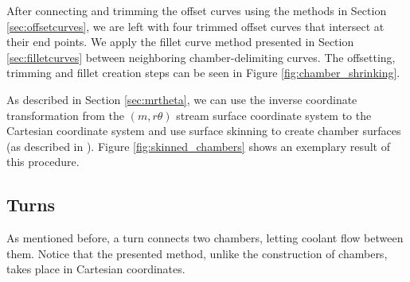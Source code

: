 \documentclass[a4paper, 11pt]{report}
\theoremstyle{definition}
\begin{document}
	After connecting and trimming the offset curves using the methods in Section \ref{sec:offsetcurves}, we are left with four trimmed offset curves that intersect at their end points. We apply the fillet curve method presented in Section \ref{sec:filletcurves} between neighboring chamber-delimiting curves. The offsetting, trimming and fillet creation steps can be seen in Figure \ref{fig:chamber_shrinking}.

	As described in Section \ref{sec:mrtheta}, we can use the inverse coordinate transformation from the $(m, r\theta)$ stream surface coordinate system to the Cartesian coordinate system and use surface skinning to create chamber surfaces (as described in \cite{Piegl1997}). Figure \ref{fig:skinned_chambers} shows an exemplary result of this procedure.

\subsection{Turns}
	As mentioned before, a turn connects two chambers, letting coolant flow between them. Notice that the presented method, unlike the construction of chambers, takes place in Cartesian coordinates.
\end{document}
